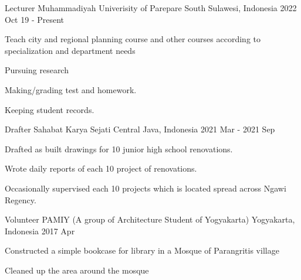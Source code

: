 

\begin{cventries}

  \cventry
    {Lecturer} %
    {Muhammadiyah Univerisity of Parepare} %
    {South Sulawesi, Indonesia} %
    {2022 Oct 19  - Present} %
    {
      \begin{cvitems} %
      \item{Teach city and regional planning course and other courses according to specialization and department needs}
      \item{Pursuing research}
        \item {Making/grading test and homework.}
        \item{Keeping student records.}
      \end{cvitems}
    }
  \cventry
    {Drafter} %
    {Sahabat Karya Sejati} %
    {Central Java, Indonesia} %
    {2021 Mar - 2021 Sep} %
    {
      \begin{cvitems} %
        \item {Drafted as built drawings for 10 junior high school renovations.}
        \item{Wrote daily reports of each 10 project of renovations.}
        \item{Occasionally supervised each 10 projects which is located spread across Ngawi Regency.}
      \end{cvitems}
    }

  \cventry
    {Volunteer} %
    {PAMIY (A group of Architecture Student of Yogyakarta)} %
    {Yogyakarta, Indonesia} %
    {2017 Apr} %
    {
      \begin{cvitems} %
        \item {Constructed a simple bookcase for library in a Mosque of Parangritis village }
        \item{Cleaned up the area around the mosque}
      \end{cvitems}
    }


\end{cventries}
